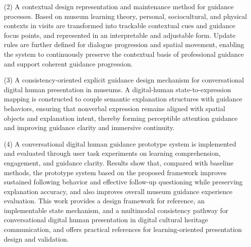 \begin{eabstract}
(2) A contextual design representation and maintenance method for guidance processes. Based on museum learning theory, personal, sociocultural, and physical contexts in visits are transformed into trackable contextual cues and guidance focus points, and represented in an interpretable and adjustable form. Update rules are further defined for dialogue progression and spatial movement, enabling the system to continuously preserve the contextual basis of professional guidance and support coherent guidance progression.

(3) A consistency-oriented explicit guidance design mechanism for conversational digital human presentation in museums. A digital-human state-to-expression mapping is constructed to couple semantic explanation structures with guidance behaviors, ensuring that nonverbal expression remains aligned with spatial objects and explanation intent, thereby forming perceptible attention guidance and improving guidance clarity and immersive continuity.

(4) A conversational digital human guidance prototype system is implemented and evaluated through user task experiments on learning comprehension, engagement, and guidance clarity. Results show that, compared with baseline methods, the prototype system based on the proposed framework improves sustained following behavior and effective follow-up questioning while preserving explanation accuracy, and also improves overall museum guidance experience evaluation. This work provides a design framework for reference, an implementable state mechanism, and a multimodal consistency pathway for conversational digital human presentation in digital cultural heritage communication, and offers practical references for learning-oriented presentation design and validation.
\end{eabstract}
